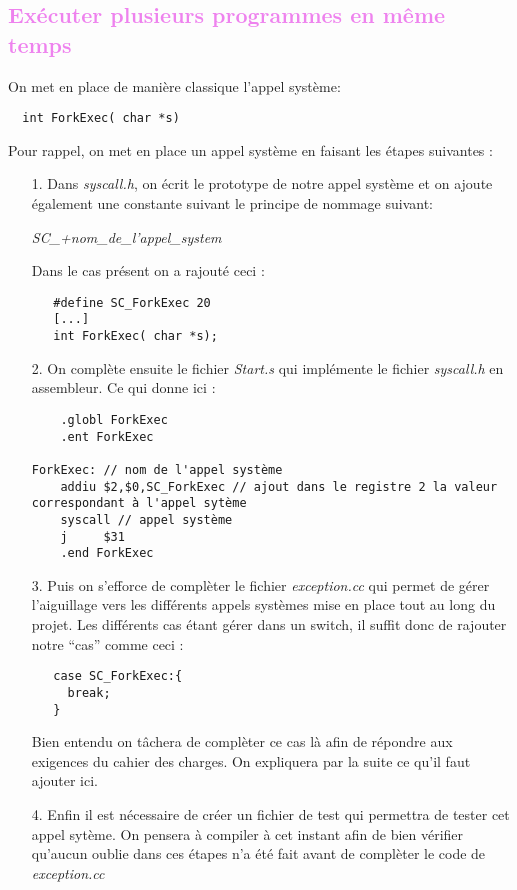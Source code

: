 \documentclass[a4paper,10pt]{report}
\begin{document}
  \textcolor{Violet}{\section{Exécuter plusieurs programmes en même temps}}
  On met en place de manière classique l'appel système: 
  \begin{lstlisting}
  int ForkExec( char *s)
  \end{lstlisting}
  Pour rappel, on met en place un appel système en faisant les étapes suivantes :
  \begin{itemize}
   \item[1.] Dans \emph{syscall.h}, on écrit le prototype de notre appel système et on ajoute également une constante suivant le principe de nommage suivant:
   \begin{center}
   \emph{SC\_+nom\_de\_l'appel\_system}
   \end{center}
  Dans le cas présent on a rajouté ceci : 
  \begin{lstlisting}
   #define SC_ForkExec 20
   [...]
   int ForkExec( char *s);
  \end{lstlisting}
  \item[2.] On complète ensuite le fichier \emph{Start.s} qui implémente le fichier \emph{syscall.h} en assembleur. Ce qui donne ici :
  \begin{lstlisting}
   	.globl ForkExec
	.ent ForkExec

ForkExec: // nom de l'appel système
	addiu $2,$0,SC_ForkExec // ajout dans le registre 2 la valeur correspondant à l'appel sytème
	syscall // appel système
	j     $31
	.end ForkExec
  \end{lstlisting}
  \item[3.] Puis on s'efforce de complèter le fichier \emph{exception.cc} qui permet de gérer l'aiguillage vers les différents appels systèmes mise en place 
  tout au long du projet. Les différents cas étant gérer dans un switch, il suffit donc de rajouter notre ``cas'' comme ceci :
  \begin{lstlisting}
   case SC_ForkExec:{
     break;
   }
  \end{lstlisting}
  Bien entendu on tâchera de complèter ce cas là afin de répondre aux exigences du cahier des charges. On expliquera par la suite ce qu'il faut ajouter ici.
  
  \item[4.] Enfin il est nécessaire de créer un fichier de test qui permettra de tester cet appel sytème. On pensera à compiler à cet instant afin de bien 
  vérifier qu'aucun oublie dans ces étapes n'a été fait avant de complèter le code de \emph{exception.cc}
  \end{itemize}  
\end{document}
